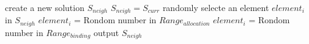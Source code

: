 \setlength{\textfloatsep}{0.2cm}
\begin{algorithm2e}[t]
	create a new solution $S_{neigh}$\;
	{
		$S_{neigh}=S_{curr}$\;
		randomly selecte an element $element_{i}$ in $S_{neigh}$\;
		{
			$element_{i}$ = Rondom number in $Range_{allocation}$\;
		}
		{
			$element_{i}$ = Rondom number in $Range_{binding}$\;
		}
	}
	output $S_{neigh}$ \;
	\caption{$Neighbor()$}
	\label{algo:neighbor_1}
\end{algorithm2e}
\setlength{\textfloatsep}{0.2cm}